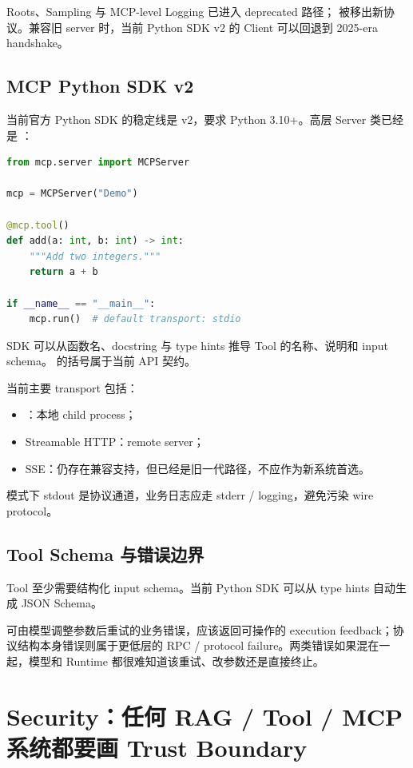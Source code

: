 \documentclass[profile=standard,twoside=false]{ipara-handbook}
\begin{document}
Roots、Sampling 与 MCP-level Logging 已进入 deprecated 路径； 被移出新协议。兼容旧 server 时，当前 Python SDK v2 的 Client 可以回退到 2025-era  handshake。

\subsection{MCP Python SDK v2}

当前官方 Python SDK 的稳定线是 v2，要求 Python 3.10+。高层 Server 类已经是 ：

\begin{lstlisting}[language=Python]
from mcp.server import MCPServer

mcp = MCPServer("Demo")

@mcp.tool()
def add(a: int, b: int) -> int:
    """Add two integers."""
    return a + b

if __name__ == "__main__":
    mcp.run()  # default transport: stdio
\end{lstlisting}

SDK 可以从函数名、docstring 与 type hints 推导 Tool 的名称、说明和 input schema。 的括号属于当前 API 契约。

当前主要 transport 包括：

\begin{itemize}
  \item {}：本地 child process；
  \item Streamable HTTP：remote server；
  \item SSE：仍存在兼容支持，但已经是旧一代路径，不应作为新系统首选。
\end{itemize}

 模式下 stdout 是协议通道，业务日志应走 stderr / logging，避免污染 wire protocol。

\subsection{Tool Schema 与错误边界}

Tool 至少需要结构化 input schema。当前 Python SDK 可以从 type hints 自动生成 JSON Schema。

可由模型调整参数后重试的业务错误，应该返回可操作的 execution feedback；协议结构本身错误则属于更低层的 RPC / protocol failure。两类错误如果混在一起，模型和 Runtime 都很难知道该重试、改参数还是直接终止。

\section{Security：任何 RAG / Tool / MCP 系统都要画 Trust Boundary}
\end{document}
